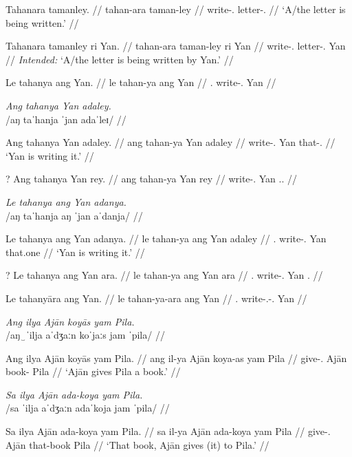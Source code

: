 \documentclass[12pt,a4paper]{scrartcl}
\newcommand{\PargI}{{\Parg}.{\Inan}}
\newcommand{\PatTI}{{\PatT}.{\Inan}}
\newcommand{\TsgM}{{\Tsg}.{\M}}
\newcommand{\TsgI}{{\Tsg}.{\Inan}}
\begin{document}
\gla Tahanara tamanley. //
\glb tahan-ara taman-ley //
\glc write-\TsgI{} letter-\PargI{} //
\glft `A/the letter is being written.' //
\endgl

\a\ljudge*\begingl
\gla Tahanara tamanley ri Yan. //
\glb tahan-ara taman-ley ri Yan //
\glc write-\TsgI{} letter-\PargI{} \Ins{} Yan //
\glft \textit{Intended:} `A/the letter is being written by Yan.' //
\endgl

\a\ljudge*\begingl
\gla Le tahanya ang Yan. //
\glb le tahan-ya ang Yan //
\glc \PatTI{} write-\TsgM{} \Aarg{} Yan //
\endgl
\xe

\pex
\a\begingl
\glpreamble \textit{Ang tahanya Yan adaley.} \\
	/aŋ taˈhanja ˈjan adaˈleɪ/ //

\gla Ang tahanya Yan adaley. //
\glb ang tahan-ya Yan adaley //
\glc \AgtT{} write-\TsgM{} Yan that-\PargI{} //
\glft `Yan is writing it.' //
\endgl

\a\ljudge?\begingl
\gla Ang tahanya Yan rey. //
\glb ang tahan-ya Yan rey //
\glc \AgtT{} write-\TsgM{} Yan \TsgI{}.\Parg{} //
\endgl
\xe

\pex
\a\begingl
\glpreamble \textit{Le tahanya ang Yan adanya.} \\
	/aŋ taˈhanja aŋ ˈjan aˈdanja/ //

\gla Le tahanya ang Yan adanya. //
\glb le tahan-ya ang Yan adaley //
\glc \PatTI{} write-\TsgM{} \Aarg{} Yan that.one //
\glft `Yan is writing it.' //
\endgl

\a\ljudge?\begingl
\gla Le tahanya ang Yan ara. //
\glb le tahan-ya ang Yan ara //
\glc \PatTI{} write-\TsgM{} \Aarg{} Yan \TsgI{} //
\endgl

\a\ljudge*\begingl
\gla Le tahanyāra ang Yan. //
\glb le tahan-ya-ara ang Yan //
\glc \PatTI{} write-\TsgM{}-\TsgI{} \Aarg{} Yan //
\endgl
\xe

\ex\begingl
\glpreamble \textit{Ang ilya Ajān koyās yam Pila.}\\
	/aŋ‿ˈilja aˈdʒaːn koˈjaːs jam ˈpila/ //

\gla Ang ilya Ajān koyās yam Pila. //
\glb ang il-ya Ajān koya-as yam Pila //
\glc \AgtT{} give-\TsgM{} Ajān book-\Parg{} \Dat{} Pila //
\glft `Ajān gives Pila a book.' //
\endgl\xe

\ex\begingl
\glpreamble \textit{Sa ilya Ajān ada-koya yam Pila.}\\
	/sa ˈilja aˈdʒaːn adaˈkoja jam ˈpila/ //

\gla Sa ilya Ajān ada-koya yam Pila. //
\glb sa il-ya Ajān ada-koya yam Pila //
\glc \PatT{} give-\TsgM{} Ajān that-book \Dat{} Pila //
\glft `That book, Ajān gives (it) to Pila.' //
\endgl\xe
\end{document}
